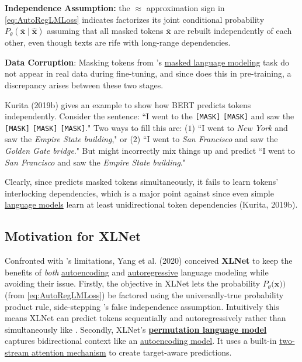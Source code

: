 \begin{enumerateSpaced}{3pt}
    \item \textbf{Independence Assumption: } the $\approx$ approximation sign in \cref{eq:AutoRegLMLoss} indicates  factorizes its joint conditional probability $P_\theta(\overline{\textbf{x}} \; | \; \hat{\textbf{x}})$ assuming that all masked tokens $\overline{\textbf{x}}$ are rebuilt independently of each other, even though texts are rife with long-range dependencies. 
    
    \item \textbf{Data Corruption}: Masking tokens from 's \hyperref[sec:maskedlanguagemodelMLM]{masked language modeling} task do not appear in real data during fine-tuning, and since  does this in pre-training, a discrepancy arises between these two stages. 
\end{enumerateSpaced}


Kurita (2019b) gives an example to show how BERT predicts tokens independently. Consider the sentence: ``I went to the \texttt{[MASK]} \texttt{[MASK]} and saw the \texttt{[MASK]} \texttt{[MASK]} \texttt{[MASK]}."  Two ways to fill this are:  ($1$) ``I went to \emph{New York} and saw the \textit{Empire State building}," or ($2$) ``I went to \emph{San Francisco} and saw the \emph{Golden Gate bridge}." But  might incorrectly mix things up and predict ``I went to \emph{San Francisco} and saw the \emph{Empire State building}." 

Clearly, since  predicts masked tokens simultaneously, it fails to learn tokens' interlocking dependencies, which is a major point against  since even simple \hyperref[sec:LanguageModels]{language models} learn at least unidirectional token dependencies (Kurita, 2019b). 




\subsection{Motivation for XLNet}

Confronted with 's limitations, Yang et al. (2020) conceived \textbf{XLNet} to keep the benefits of \emph{both} \hyperref[sec:autoencodingLM]{autoencoding} and \hyperref[sec:autoregressiveLM]{autoregressive} language modeling while avoiding their issue. Firstly, the  objective in XLNet lets the probability $P_\theta(\textbf{x))}$ (from \cref{eq:AutoRegLMLoss}) be factored using the universally-true probability product rule, side-stepping 's false independence assumption. Intuitively this means XLNet can predict tokens sequentially and autoregressively rather than simultaneously like . Secondly, XLNet's \textbf{\hyperref[sec:permutationLM]{permutation language model}} captures bidirectional context like an \hyperref[sec:autoencodingLM]{autoencoding model}. It uses a built-in \hyperref[sec:TwoStreamSelfAttention]{two-stream attention mechanism} to create target-aware predictions. 
 

